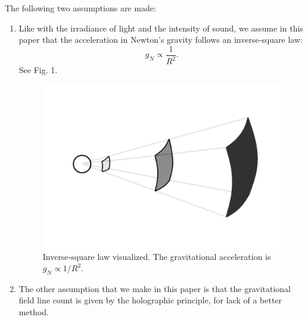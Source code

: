 \documentclass[12pt]{article}
\begin{document}
The following two assumptions are made:
\begin{enumerate}
\item Like with the irradiance of light and the intensity of sound, we assume in this paper that the acceleration in Newton's gravity follows an inverse-square law:
\begin{equation}
g_N \propto \frac{1}{R^2}.
\end{equation}
See Fig. 1.
\begin{figure} 
\centering
  \includegraphics[width = 5 in]{inverse_square_law.png}
  \caption{
Inverse-square law visualized.
The gravitational acceleration is $g_N \propto 1/R^2$.
}
\end{figure}


\item The other assumption that we make in this paper is that the gravitational field line count is given by the holographic principle, for lack of a better method.
\end{enumerate}
\end{document}
